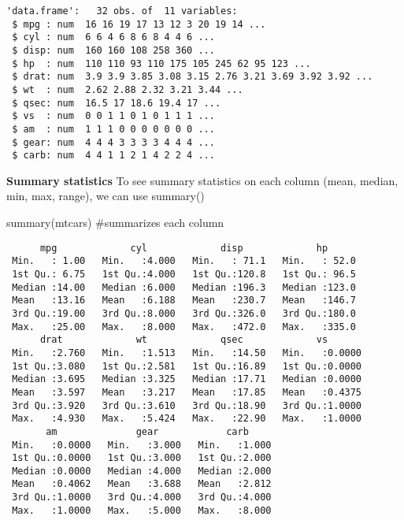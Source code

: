 \documentclass[
  letterpaper,
  DIV=11,
  numbers=noendperiod]{scrartcl}
\newenvironment{Shaded}{\begin{snugshade}}{\end{snugshade}}
\newcommand{\CommentTok}[1]{\textcolor[rgb]{0.37,0.37,0.37}{#1}}
\newcommand{\FunctionTok}[1]{\textcolor[rgb]{0.28,0.35,0.67}{#1}}
\newcommand{\NormalTok}[1]{\textcolor[rgb]{0.00,0.23,0.31}{#1}}
\begin{document}
\begin{verbatim}
'data.frame':   32 obs. of  11 variables:
 $ mpg : num  16 16 19 17 13 12 3 20 19 14 ...
 $ cyl : num  6 6 4 6 8 6 8 4 4 6 ...
 $ disp: num  160 160 108 258 360 ...
 $ hp  : num  110 110 93 110 175 105 245 62 95 123 ...
 $ drat: num  3.9 3.9 3.85 3.08 3.15 2.76 3.21 3.69 3.92 3.92 ...
 $ wt  : num  2.62 2.88 2.32 3.21 3.44 ...
 $ qsec: num  16.5 17 18.6 19.4 17 ...
 $ vs  : num  0 0 1 1 0 1 0 1 1 1 ...
 $ am  : num  1 1 1 0 0 0 0 0 0 0 ...
 $ gear: num  4 4 4 3 3 3 3 4 4 4 ...
 $ carb: num  4 4 1 1 2 1 4 2 2 4 ...
\end{verbatim}

\textbf{Summary statistics} To see summary statistics on each column
(mean, median, min, max, range), we can use summary()

\begin{Shaded}
\begin{Highlighting}[]
\FunctionTok{summary}\NormalTok{(mtcars) }\CommentTok{\#summarizes each column}
\end{Highlighting}
\end{Shaded}

\begin{verbatim}
      mpg             cyl             disp             hp       
 Min.   : 1.00   Min.   :4.000   Min.   : 71.1   Min.   : 52.0  
 1st Qu.: 6.75   1st Qu.:4.000   1st Qu.:120.8   1st Qu.: 96.5  
 Median :14.00   Median :6.000   Median :196.3   Median :123.0  
 Mean   :13.16   Mean   :6.188   Mean   :230.7   Mean   :146.7  
 3rd Qu.:19.00   3rd Qu.:8.000   3rd Qu.:326.0   3rd Qu.:180.0  
 Max.   :25.00   Max.   :8.000   Max.   :472.0   Max.   :335.0  
      drat             wt             qsec             vs        
 Min.   :2.760   Min.   :1.513   Min.   :14.50   Min.   :0.0000  
 1st Qu.:3.080   1st Qu.:2.581   1st Qu.:16.89   1st Qu.:0.0000  
 Median :3.695   Median :3.325   Median :17.71   Median :0.0000  
 Mean   :3.597   Mean   :3.217   Mean   :17.85   Mean   :0.4375  
 3rd Qu.:3.920   3rd Qu.:3.610   3rd Qu.:18.90   3rd Qu.:1.0000  
 Max.   :4.930   Max.   :5.424   Max.   :22.90   Max.   :1.0000  
       am              gear            carb      
 Min.   :0.0000   Min.   :3.000   Min.   :1.000  
 1st Qu.:0.0000   1st Qu.:3.000   1st Qu.:2.000  
 Median :0.0000   Median :4.000   Median :2.000  
 Mean   :0.4062   Mean   :3.688   Mean   :2.812  
 3rd Qu.:1.0000   3rd Qu.:4.000   3rd Qu.:4.000  
 Max.   :1.0000   Max.   :5.000   Max.   :8.000  
\end{verbatim}
\end{document}
